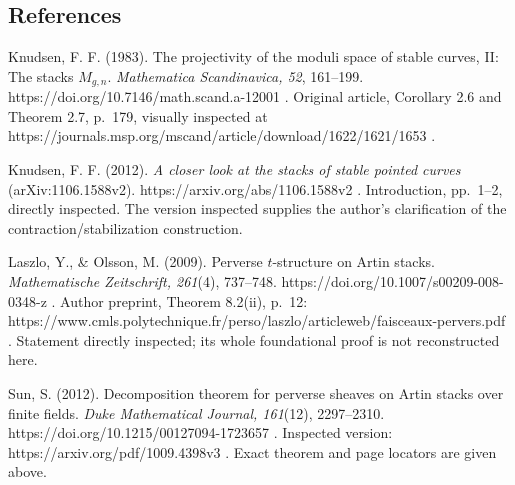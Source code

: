 \subsection{References}\label{references}

Knudsen, F. F. (1983). The projectivity of the moduli space of stable
curves, II: The stacks \(M_{g,n}\). \emph{Mathematica Scandinavica, 52},
161--199. https://doi.org/10.7146/math.scand.a-12001 . Original article,
Corollary 2.6 and Theorem 2.7, p.~179, visually inspected at
https://journals.msp.org/mscand/article/download/1622/1621/1653 .

Knudsen, F. F. (2012). \emph{A closer look at the stacks of stable
pointed curves} (arXiv:1106.1588v2). https://arxiv.org/abs/1106.1588v2 .
Introduction, pp.~1--2, directly inspected. The version inspected
supplies the author's clarification of the contraction/stabilization
construction.

Laszlo, Y., \& Olsson, M. (2009). Perverse \(t\)-structure on Artin
stacks. \emph{Mathematische Zeitschrift, 261}(4), 737--748.
https://doi.org/10.1007/s00209-008-0348-z . Author preprint, Theorem
8.2(ii), p.~12:
https://www.cmls.polytechnique.fr/perso/laszlo/articleweb/faisceaux-pervers.pdf
. Statement directly inspected; its whole foundational proof is not
reconstructed here.

Sun, S. (2012). Decomposition theorem for perverse sheaves on Artin
stacks over finite fields. \emph{Duke Mathematical Journal, 161}(12),
2297--2310. https://doi.org/10.1215/00127094-1723657 . Inspected
version: https://arxiv.org/pdf/1009.4398v3 . Exact theorem and page
locators are given above.
